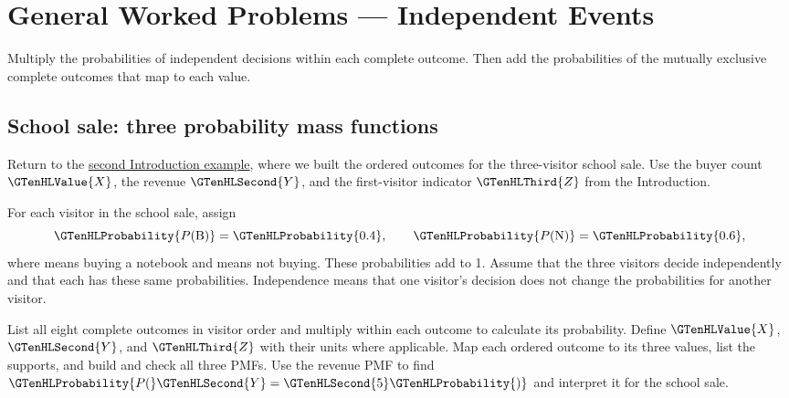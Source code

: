 
\section{General Worked Problems --- Independent Events}\label{sec:t2-c1-independent-events}

 \vspace{5mm}

Multiply the probabilities of independent decisions within each complete outcome. Then add the probabilities of the mutually exclusive complete outcomes that map to each value.

\subsection{School sale: three probability mass functions}
\label{subsec:t2-c1-assign-probability-to-each-value}

Return to the \hyperref[subsec:t2-c1-independent-outcomes]{second Introduction example}, where we built the ordered outcomes for the three-visitor school sale. Use the buyer count $\GTenHLValue{X}$, the revenue $\GTenHLSecond{Y}$, and the first-visitor indicator $\GTenHLThird{Z}$ from the Introduction.

For each visitor in the school sale, assign
\[
\GTenHLProbability{P(\mathrm{B})}=\GTenHLProbability{0.4},\qquad \GTenHLProbability{P(\mathrm{N})}=\GTenHLProbability{0.6},
\]
where  means buying a notebook and  means not buying. These probabilities add to 1. Assume that the three visitors decide independently and that each has these same probabilities. Independence means that one visitor's decision does not change the probabilities for another visitor.

    {List all eight complete outcomes in visitor order and multiply within each outcome to calculate its probability.}
    {Define $\GTenHLValue{X}$, $\GTenHLSecond{Y}$, and $\GTenHLThird{Z}$ with their units where applicable. Map each ordered outcome to its three values, list the supports, and build and check all three PMFs.}
    {Use the revenue PMF to find $\GTenHLProbability{P(}\GTenHLSecond{Y}=\GTenHLSecond{5}\GTenHLProbability{)}$ and interpret it for the school sale.}

